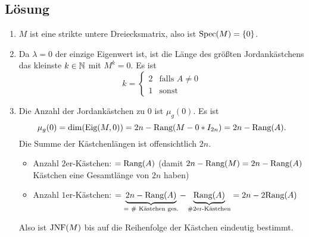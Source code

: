 \subsection{Lösung}
\begin{enumerate}
	\item \( M \) ist eine strikte untere Dreiecksmatrix, also ist \( \text{Spec}(M) = \{ 0 \} \).

	\item Da \( \lambda = 0 \) der einzige Eigenwert ist, ist die Länge des größten Jordankästchens das kleinste \( k \in \mathbb{N} \) mit \( M^k = 0 \). Es ist
		\begin{equation*}
		 	k = \begin{cases}
		 		2 &\text{falls } A \neq 0 \\
		 		1 &\text{sonst}
		 	\end{cases}
		 \end{equation*} 
	\item Die Anzahl der Jordankästchen zu \( 0 \) ist \( \mu_g(0) \). Es ist
		\begin{equation*}
			\mu_g(0) = \dim(\text{Eig}(M, 0)) = 2n - \text{Rang}(M - 0*I_{2n}) = 2n - \text{Rang}(A)\text{.}
		\end{equation*}
		Die Summe der Kästchenlängen ist offensichtlich \( 2n \).
		\begin{itemize}
			\item Anzahl \( 2 \)er-Kästchen: \( = \text{Rang}(A) \) (damit \( 2n-\text{Rang}(M) = 2n-\text{Rang}(A) \) Kästchen eine Gesamtlänge von \( 2n \) haben)
			\item Anzahl \( 1 \)er-Kästchen: \( = \underbrace{2n-\text{Rang}(A)}_{\text{= \# Kästchen ges.}} - \underbrace{\text{Rang}(A)}_{\text{\#2er-Kästchen}} = 2n - 2\text{Rang}(A) \)
		\end{itemize}
		Also ist \( \text{JNF}(M) \) bis auf die Reihenfolge der Kästchen eindeutig bestimmt.


\end{enumerate}
